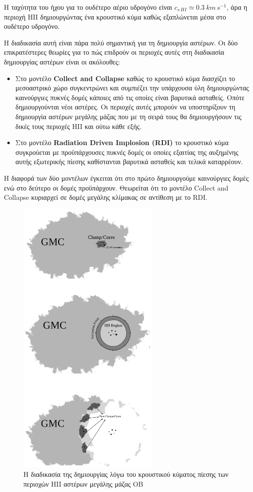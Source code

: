 \documentclass[a4paper,12pt]{memoir}
\begin{document}
Η ταχύτητα του ήχου για το ουδέτερο αέριο υδρογόνο είναι $c_{s \, HI}\simeq 0.3 \ km \, s^{-1}$, άρα η περιοχή HII δημιουργώντας ένα κρουστικό κύμα καθώς εξαπλώνεται μέσα στο ουδέτερο υδρογόνο. 

Η διαδικασία αυτή είναι πάρα πολύ σημαντική για τη δημιουργία αστέρων. Οι δύο επικρατέστερες θεωρίες για το πώς επιδρούν οι περιοχές αυτές στη διαδικασία δημιουργίας αστέρων είναι οι ακόλουθες:
\begin{itemize}
	\item Στο μοντέλο \textbf{Collect and Collapse} \cite{whitworth_1994} καθώς το κρουστικό κύμα διασχίζει το μεσοαστρικό χώρο συγκεντρώνει και συμπιέζει την υπάρχουσα ύλη δημιουργώντας καινούργιες πυκνές δομές κάποιες από τις οποίες είναι βαρυτικά ασταθείς. Οπότε δημιουργούνται νέοι αστέρες. Οι περιοχές αυτές μπορούν να υποστηρίξουν τη δημιουργία αστέρων μεγάλης μάζας που με τη σειρά τους θα δημιουργήσουν τις δικές τους περιοχές HII και ούτω κάθε εξής.
	\item Στο μοντέλο \textbf{Radiation Driven Implosion (RDI)} \cite{bertoldi_1989} το κρουστικό κύμα συγκρούεται με προϋπάρχουσες πυκνές δομές οι οποίες εξαιτίας της αυξημένης αυτής εξωτερικής πίεσης καθίστανται βαρυτικά ασταθείς και τελικά καταρρέουν.
\end{itemize}
Η διαφορά των δύο μοντέλων έγκειται ότι στο πρώτο δημιουργούμε καινούργιες δομές ενώ στο δεύτερο οι δομές προϋπάρχουν. Θεωρείται ότι το μοντέλο Collect and Collapse κυριαρχεί σε δομές μεγάλης κλίμακας σε αντίθεση με το RDI.

\begin{figure}[h]
	\centering
	\includegraphics[height=14cm]{images/induced.ps}
	\caption{Η διαδικασία της δημιουργίας λόγω του κρουστικού κύματος πίεσης των περιοχών HII αστέρων μεγάλης μάζας OB}
\end{figure}
\end{document}
